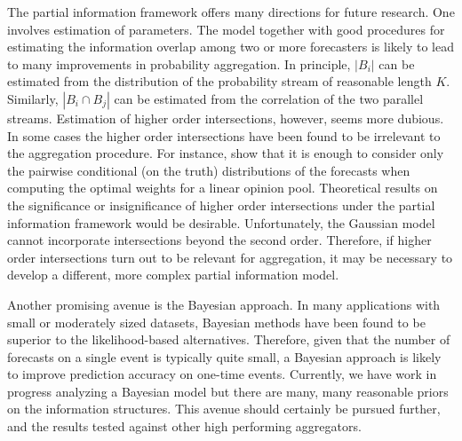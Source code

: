 \documentclass[12pt]{article}
\theoremstyle{definition}
\theoremstyle{definition}
\begin{document}
The partial information framework offers many directions for future research.  One involves estimation of parameters.  The model together with good procedures for estimating
the information overlap among two or more forecasters is likely to lead to many
improvements in probability aggregation. 
In principle, $|B_i|$ can be
estimated from the distribution of the probability stream of reasonable length $K$. Similarly, $|B_i \cap B_j|$ can be estimated from the correlation of the two parallel streams.  Estimation of higher order intersections, however, seems more
dubious. In some cases the higher order intersections have been found to be irrelevant to the aggregation procedure. For instance, \citet{degroot1991optimal} show that it is enough to consider only the pairwise conditional (on the truth) distributions of the forecasts when computing the optimal weights for a linear opinion pool. 
Theoretical results on the significance or insignificance
of higher order intersections under the partial information framework
would be desirable. Unfortunately, the Gaussian model cannot incorporate intersections beyond the second order. Therefore, if higher order intersections turn out to be relevant for aggregation, it may be necessary to develop a different, more complex partial information model. 

Another promising avenue is the Bayesian approach. In many applications with small or moderately sized datasets, Bayesian methods have been found to be superior to the likelihood-based alternatives. Therefore, given that the number of forecasts on a single event is typically quite small, a Bayesian approach is likely to improve prediction accuracy on one-time events. Currently, we have
work in progress analyzing a Bayesian model but there are many, many
reasonable priors on the information structures. 
 This avenue should
certainly be pursued further, and the results tested against other high
performing aggregators.





%
%
%

\end{document}
